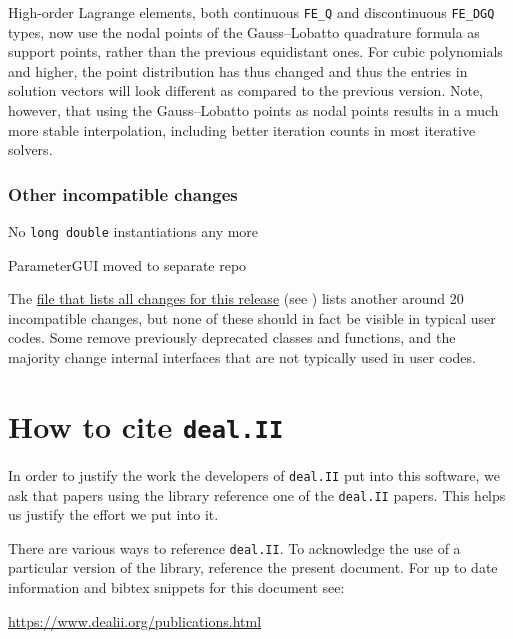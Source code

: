 \documentclass{ansarticle-preprint}
\newcommand{\specialword}[1]{\texttt{#1}}
\newcommand{\dealii}{{\specialword{deal.II}}}
\begin{document}
High-order Lagrange elements, both continuous \verb!FE_Q! and discontinuous
\verb!FE_DGQ! types, now use the nodal points of the Gauss--Lobatto
quadrature formula as support points, rather than the previous equidistant
ones. For cubic polynomials and higher, the point distribution has thus changed and
thus the entries in solution vectors will look different as compared to the previous version. Note, however,
that using the Gauss--Lobatto points as nodal points results in a much more
stable interpolation, including better iteration counts in most iterative
solvers.

\subsubsection{Other incompatible changes}

No \texttt{long double} instantiations any more

ParameterGUI moved to separate repo

The
\href{https://www.dealii.org/8.5.0/doxygen/deal.II/changes_between_8_4_and_8_5.html}{file
  that lists all changes for this release} (see \cite{changes85})
lists another around 20
incompatible changes, but none of these should in fact be visible in
typical user codes. Some remove previously deprecated classes and
functions, and the majority change internal interfaces that are not
typically used in user codes.



\section{How to cite \dealii{}}\label{sec:cite}

In order to justify the work the developers of \dealii{} put into this
software, we ask that papers using the library reference one of the
\dealii{} papers. This helps us justify the effort we put into it.

There are various ways to reference \dealii{}. To acknowledge the use of a
particular version of the library, reference the present document. For up
to date information and bibtex snippets for this document see:
\begin{center}
 \url{https://www.dealii.org/publications.html}
\end{center}

\end{document}
